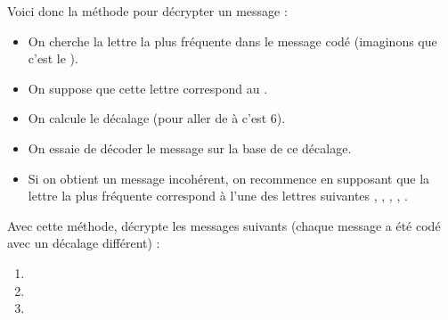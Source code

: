 \documentclass[class=report,crop=false, 12pt]{standalone}
\begin{document}
\begin{activite}
Voici donc la méthode pour décrypter un message :
\begin{itemize}
  \item On cherche la lettre la plus fréquente dans le message codé (imaginons que c'est le ).
  \item On suppose que cette lettre correspond au .
  \item On calcule le décalage (pour aller de  à  c'est $6$).
  \item On essaie de décoder le message sur la base de ce décalage.
  \item Si on obtient un message incohérent, on recommence en supposant que la lettre la plus fréquente correspond à l'une des lettres suivantes , , , , .
\end{itemize}

Avec cette méthode, décrypte les messages suivants (chaque message a été codé avec un décalage différent) :

\begin{enumerate}
  \item {}
  \item {}
  \item {}
\end{enumerate}

\end{activite}
\end{document}
